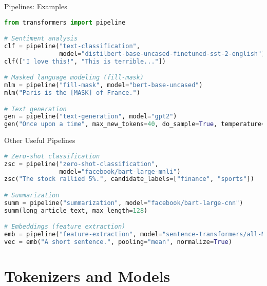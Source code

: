 \documentclass[aspectratio=169]{beamer}
\begin{document}
\begin{frame}[fragile]{Pipelines: Examples}

  \begin{lstlisting}[language=Python]
from transformers import pipeline

# Sentiment analysis
clf = pipeline("text-classification",
               model="distilbert-base-uncased-finetuned-sst-2-english")
clf(["I love this!", "This is terrible..."])

# Masked language modeling (fill-mask)
mlm = pipeline("fill-mask", model="bert-base-uncased")
mlm("Paris is the [MASK] of France.")

# Text generation
gen = pipeline("text-generation", model="gpt2")
gen("Once upon a time", max_new_tokens=40, do_sample=True, temperature=0.8)
  \end{lstlisting}
\end{frame}

\begin{frame}[fragile]{Other Useful Pipelines}
  \begin{lstlisting}[language=Python]
# Zero-shot classification
zsc = pipeline("zero-shot-classification",
               model="facebook/bart-large-mnli")
zsc("The stock rallied 5%.", candidate_labels=["finance", "sports"]) 

# Summarization
summ = pipeline("summarization", model="facebook/bart-large-cnn")
summ(long_article_text, max_length=128)

# Embeddings (feature extraction)
emb = pipeline("feature-extraction", model="sentence-transformers/all-MiniLM-L6-v2")
vec = emb("A short sentence.", pooling="mean", normalize=True)
  \end{lstlisting}
\end{frame}

\section{Tokenizers and Models}
\end{document}
